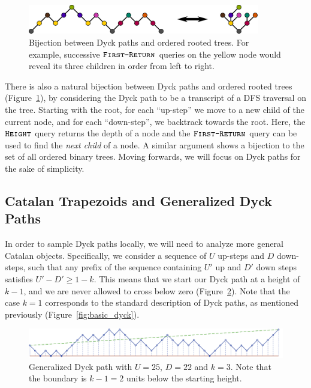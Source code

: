 \label{sec:bijections_to_other_catalan_objects}
\begin{figure}[htbp]
    \centering
    \includegraphics[width=0.9\textwidth]{images/dyck_tree_bijection.pdf}
    \caption{Bijection between Dyck paths and ordered rooted trees.
    For example, successive $\texttt{\textsc{First-Return}}$ queries on the yellow node would reveal its three children in order from left to right.}
    \label{fig:dyck_tree_bijection}
\end{figure}
There is also a natural bijection between Dyck paths and ordered rooted trees (Figure~\ref{fig:dyck_tree_bijection}),
by considering the Dyck path to be a transcript of a DFS traversal on the tree.
Starting with the root, for each ``up-step'' we move to a new child of the current node, and for each ``down-step'', we backtrack towards the root.
Here, the $\texttt{\textsc{Height}}$ query returns the depth of a node and the $\texttt{\textsc{First-Return}}$ query can be used to find the \emph{next child} of a node.
A similar argument shows a bijection to the set of all ordered binary trees.
Moving forwards, we will focus on Dyck paths for the sake of simplicity.



\subsection{Catalan Trapezoids and Generalized Dyck Paths}
In order to sample Dyck paths locally, we will need to analyze more general Catalan objects.
Specifically, we consider a sequence of $U$ up-steps and $D$ down-steps,
such that any prefix of the sequence containing $U'$ up and $D'$ down steps satisfies $U'-D' \ge 1-k$.
This means that we start our Dyck path at a height of $k-1$, and we are never allowed to cross below zero (Figure~\ref{fig:complex_dyck}).
Note that the case $k=1$ corresponds to the standard description of Dyck paths, as mentioned previously (Figure~\ref{fig:basic_dyck}).
\begin{figure}[htbp]
    \centering
    \includegraphics[width=\textwidth]{images/complex_dyck_path.pdf}
    \caption{Generalized Dyck path with $U = 25$, $D = 22$ and $k = 3$.
             Note that the boundary is $k-1 = 2$ units below the starting height.} \label{fig:complex_dyck}
\end{figure}

